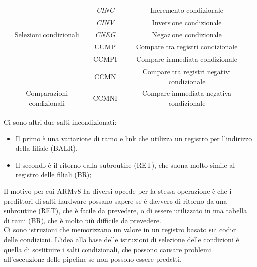 \documentclass[12pt,a4paper]{article}
\begin{document}
\begin{center}
\begin{tabular}{|c|c|c|}
                                                                                                             & \textit{CINC}   & Incremento condizionale                                                                                   \\ \cline{2-3} 
                                                                                                             & \textit{CINV}   & Inversione condizionale                                                                                   \\ \cline{2-3} 
\multirow{-9}{*}{Selezioni condizionali}                                                                     & \textit{CNEG}   & Negazione condizionale                                                                                    \\ \hline
                                                                                                             & CCMP            & Compare tra registri condizionale                                                                    \\ \cline{2-3} 
                                                                                                             & CCMPI           & Compare immediata condizionale                                                                       \\ \cline{2-3} 
                                                                                                             & CCMN            & Compare tra registri negativi condizionale                                                           \\ \cline{2-3} 
\multirow{-4}{*}{Comparazioni condizionali}                                                                  & CCMNI           & Compare immediata negativa condizionale                                                              \\ \hline
\end{tabular}
\end{center}
Ci sono altri due salti incondizionati:
\begin{itemize}
\item Il primo è una variazione di ramo e link che utilizza un registro per l'indirizzo della filiale (BALR). 
\item Il secondo è il ritorno dalla subroutine (RET), che suona molto simile al registro delle filiali (BR);
\end{itemize}
Il motivo per cui ARMv8 ha diversi opcode per la stessa operazione è che i predittori di salti hardware possano sapere se è davvero di ritorno da una subroutine (RET), che è facile da prevedere, o di essere utilizzato in una tabella di rami (BR), che è molto più difficile da prevedere.\\
Ci sono istruzioni che memorizzano un valore in un registro basato sui codici delle condizioni. L'idea alla base delle istruzioni di selezione delle condizioni è quella di sostituire i salti condizionali, che possono causare problemi all'esecuzione delle pipeline se non possono essere predetti.
\end{document}
